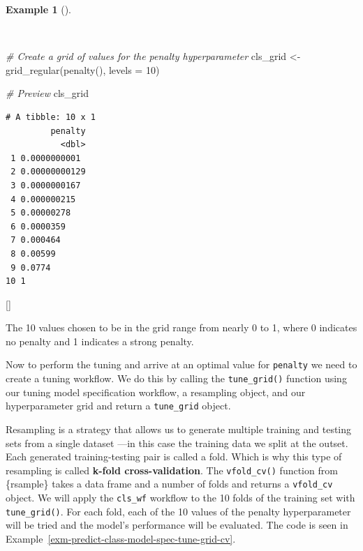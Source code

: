 \documentclass[
  letterpaper,
  krantz1]{latex/krantz-mod}
\newenvironment{Shaded}{\begin{snugshade}}{\end{snugshade}}
\newcommand{\AttributeTok}[1]{\textcolor[rgb]{0.00,0.00,0.00}{#1}}
\newcommand{\CommentTok}[1]{\textcolor[rgb]{0.00,0.00,0.00}{\textit{#1}}}
\newcommand{\DecValTok}[1]{\textcolor[rgb]{0.00,0.00,0.00}{#1}}
\newcommand{\FunctionTok}[1]{\textcolor[rgb]{0.00,0.00,0.00}{#1}}
\newcommand{\NormalTok}[1]{\textcolor[rgb]{0.00,0.00,0.00}{#1}}
\newcommand{\OtherTok}[1]{\textcolor[rgb]{0.00,0.00,0.00}{#1}}
\newcommand{\cindex}[1]{%
  \StrSubstitute{#1}{_}{\_}[\temp]%
  \index{\temp}%
}
\theoremstyle{definition}
\theoremstyle{definition}
\newtheorem{example}{Example}[chapter]
\theoremstyle{remark}
\begin{document}
\begin{example}[]\protect\hypertarget{exm-predict-class-model-spec-tune-grid-values}{}\label{exm-predict-class-model-spec-tune-grid-values}

~

\begin{Shaded}
\begin{Highlighting}[numbers=left,,]
\CommentTok{\# Create a grid of values for the penalty hyperparameter}
\NormalTok{cls\_grid }\OtherTok{\textless{}{-}}
  \FunctionTok{grid\_regular}\NormalTok{(}\FunctionTok{penalty}\NormalTok{(), }\AttributeTok{levels =} \DecValTok{10}\NormalTok{)}

\CommentTok{\# Preview}
\NormalTok{cls\_grid}
\end{Highlighting}
\end{Shaded}

\begin{verbatim}
# A tibble: 10 x 1
         penalty
           <dbl>
 1 0.0000000001 
 2 0.00000000129
 3 0.0000000167 
 4 0.000000215  
 5 0.00000278   
 6 0.0000359    
 7 0.000464     
 8 0.00599      
 9 0.0774       
10 1            
\end{verbatim}

 \cindex{grid_regular()}

\end{example}

The 10 values chosen to be in the grid range from nearly 0 to 1, where 0
indicates no penalty and 1 indicates a strong penalty.

Now to perform the tuning and arrive at an optimal value for
\texttt{penalty} we need to create a tuning workflow. We do this by
calling the \texttt{tune\_grid()} function using our tuning model
specification workflow, a resampling object, and our hyperparameter grid
and return a \texttt{tune\_grid} object.

Resampling is a strategy that allows us to generate
multiple training and testing sets from a single dataset ---in this case
the training data we split at the outset. Each generated
training-testing pair is called a fold. Which is why this type of
resampling is called \textbf{k-fold
cross-validation}. The
\texttt{vfold\_cv()} function from \{rsample\} takes a data frame and a
number of folds and returns a \texttt{vfold\_cv} object. We will apply
the \texttt{cls\_wf} workflow to the 10 folds of the training set with
\texttt{tune\_grid()}. For each fold, each of the 10 values of the
penalty hyperparameter will be tried and the model's performance will be
evaluated. The code is seen in
Example~\ref{exm-predict-class-model-spec-tune-grid-cv}.
\end{document}
